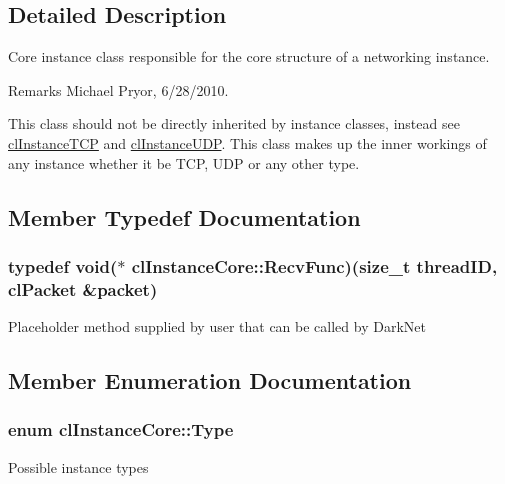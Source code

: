 \subsection{Detailed Description}
Core instance class responsible for the core structure of a networking instance. \begin{DoxyRemark}{Remarks}
Michael Pryor, 6/28/2010.
\end{DoxyRemark}
This class should not be directly inherited by instance classes, instead see \hyperlink{classcl_instance_t_c_p}{clInstanceTCP} and \hyperlink{classcl_instance_u_d_p}{clInstanceUDP}. This class makes up the inner workings of any instance whether it be TCP, UDP or any other type. 

\subsection{Member Typedef Documentation}
\hypertarget{classcl_instance_core_afa96c2a2c0b26b6a9256b87798bf9587}{
\subsubsection[{RecvFunc}]{\setlength{\rightskip}{0pt plus 5cm}typedef void($\ast$ {\bf clInstanceCore::RecvFunc})(size\_\-t threadID, {\bf clPacket} \&packet)}}
\label{classcl_instance_core_afa96c2a2c0b26b6a9256b87798bf9587}
Placeholder method supplied by user that can be called by DarkNet 

\subsection{Member Enumeration Documentation}
\hypertarget{classcl_instance_core_a576bdbf2ccec2df9cb2aab1edfe9dd2e}{
\subsubsection[{Type}]{\setlength{\rightskip}{0pt plus 5cm}enum {\bf clInstanceCore::Type}}}
\label{classcl_instance_core_a576bdbf2ccec2df9cb2aab1edfe9dd2e}
Possible instance types 

